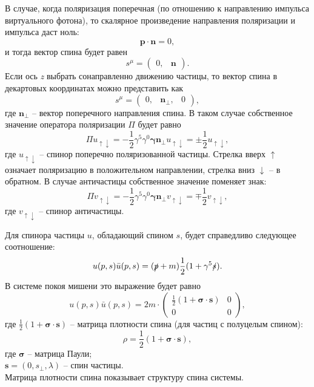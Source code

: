 \documentclass{extreport}
\begin{document}
В случае, когда поляризация поперечная (по отношению к направлению импульса виртуального фотона), то скалярное произведение направления поляризации и импульса даст ноль:
\begin{equation}
	\boldsymbol{p} \cdot \boldsymbol{n} = 0,
\end{equation}
и тогда вектор спина будет равен
\begin{equation}
	s^\mu = \begin{pmatrix}
		0, & \boldsymbol{n}
	\end{pmatrix}.
\end{equation}
Если ось \textit{z} выбрать сонаправленно движению частицы, то вектор спина в декартовых координатах можно представить как
\begin{equation}
	s^\mu = \begin{pmatrix}
		0, & \boldsymbol{n}_{\perp}, & 0
	\end{pmatrix},
\end{equation}
где $\boldsymbol{n}_{\perp}$ -- вектор поперечного направления спина. В таком случае собственное значение оператора поляризации $\Pi$ будет равно
\begin{equation}
	\Pi u_{\uparrow \downarrow} = -\frac{1}{2} \gamma^5 \gamma^0 \boldsymbol{\gamma} \boldsymbol{n}_{\perp} u_{\uparrow \downarrow} = \pm \frac{1}{2} u_{\uparrow \downarrow},
\end{equation}
где $u_{\uparrow \downarrow}$ -- спинор поперечно поляризованной частицы. Стрелка вверх  $\uparrow$ означает поляризацию в положительном направлении, стрелка вниз $\downarrow$ -- в обратном.
В случае античастицы собственное значение поменяет знак:
\begin{equation}
	\Pi v_{\uparrow \downarrow} = -\frac{1}{2} \gamma^5 \gamma^0 \boldsymbol{\gamma} \boldsymbol{n}_{\perp} v_{\uparrow \downarrow} = \mp \frac{1}{2} v_{\uparrow \downarrow},
\end{equation}
где $ v_{\uparrow \downarrow}$ -- спинор античастицы.

Для спинора частицы $u$, обладающий спином $s$, будет справедливо следующее соотношение:
\begin{equation}
	u(p, s) \bar{u}(p, s) = (\slashed{p}+m) \frac{1}{2} (1+ \gamma^5 \slashed{s}).
\end{equation}
В системе покоя мишени это выражение будет равно
\begin{equation}
	u(p, s) \bar{u}(p, s) = 2m \cdot \begin{pmatrix}
		\frac{1}{2}(1+\boldsymbol{\sigma} \cdot \boldsymbol{s}) & 0 \\ 0 & 0
	\end{pmatrix},
\end{equation}
где $\frac{1}{2}(1+\boldsymbol{\sigma} \cdot \boldsymbol{s})$ -- матрица плотности спина (для частиц с полуцелым спином):
\begin{equation}
	\rho = \frac{1}{2}(1+\boldsymbol{\sigma} \cdot \boldsymbol{s}),
\end{equation}
где $\boldsymbol{\sigma}$ -- матрица Паули; \\ $\boldsymbol{s} = (0, s_\perp, \lambda)$ -- спин частицы.\\
Матрица плотности спина показывает структуру спина системы.
\end{document}
